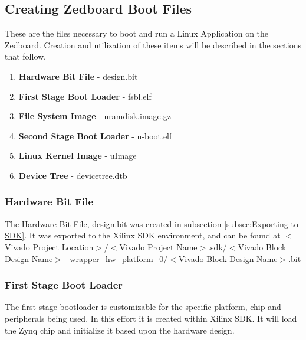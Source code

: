 \documentclass[12pt]{article}
\begin{document}
\subsection{Creating Zedboard Boot Files} \label{subsec:ZedboardBoot} These are the files necessary to boot and run a Linux Application on the Zedboard.  Creation and utilization of these items will be described in the sections that follow.
\begin{enumerate}
\item{\textbf{Hardware Bit File}}\label{itm:bit} - design.bit
\item{\textbf{First Stage Boot Loader}}\label{itm:fsbl} - fsbl.elf
\item{\textbf{File System Image}}\label{itm:uramdisk} - uramdisk.image.gz
\item{\textbf{Second Stage Boot Loader}}\label{itm:uboot} - u-boot.elf
\item{\textbf{Linux Kernel Image}}\label{itm:uImage} - uImage
\item{\textbf{Device Tree}}\label{itm:devicetree} - devicetree.dtb
\end{enumerate}

\subsubsection{Hardware Bit File}
The Hardware Bit File, design.bit was created in subsection \ref{subsec:Exporting to SDK}.  It was exported to the Xilinx SDK environment, and can be found at $<$Vivado Project Location$>$/$<$Vivado Project Name$>$.sdk/$<$Vivado Block Design Name$>$\_wrapper\_hw\_platform\_0/$<$Vivado Block Design Name$>$.bit
\subsubsection{First Stage Boot Loader} \label{subsec:FSBL}
The first stage bootloader is customizable for the specific platform, chip and peripherals being used.  In this effort it is created within Xilinx SDK.  It will load the Zynq chip and initialize it based upon the hardware design.
\end{document}
